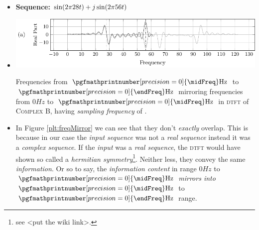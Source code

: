 \documentclass[../../course]{subfiles}
\begin{document}
\begin{itemize} [label=]
        \def\firstRange{$0 \si{Hz}$ to $\pgfmathprintnumber[precision = 0]{\midFreq}\si{Hz}$ }
        \def\secondRange{%
            $\pgfmathprintnumber[precision = 0]{\midFreq} \si{Hz}$ to %
            $\pgfmathprintnumber[precision = 0]{\endFreq} \si{Hz}$ %
        }

        \begin{itemize} [label=]

            \item \textbf{Sequence:} $\sin(2 \pi 28 t) + j \sin(2 \pi 56 t)$

            \item
                \begin{minipage}[b] {0.85\textwidth}
                    \vspace{6pt}
                    \centering
                     {
                        \includegraphics[height = 0.8\textheight] {tikzpics/plotFreqMirror.pdf}
                    }

                     {
                        Frequencies from \secondRange mirroring frequencies from \firstRange in
                        \textsc{dtft} of \textsc{Complex B}, having \emph{sampling frequency} of
                        \sampFreqSligGreatJust.
                    }
                    \label{plt:freqMirror}

                \end{minipage}

            \item
                In Figure \ref{plt:freqMirror} we can see that they don't \emph{exactly}
                overlap. This is because in our case the \emph{input sequence} was not a
                \emph{real sequence} instead it was a \emph{complex sequence}. If the
                \emph{input} was a \emph{real sequence}, the \textsc{dtft} would have
                shown so called a \emph{hermitian symmetry}\footnote{see <put the wiki
                link>.}. Neither less, they convey the same \emph{information}. Or so
                to say, the \emph{information content} in range \firstRange \emph{mirrors
                into} \secondRange range.


\end{itemize}
\end{itemize}
\end{document}
